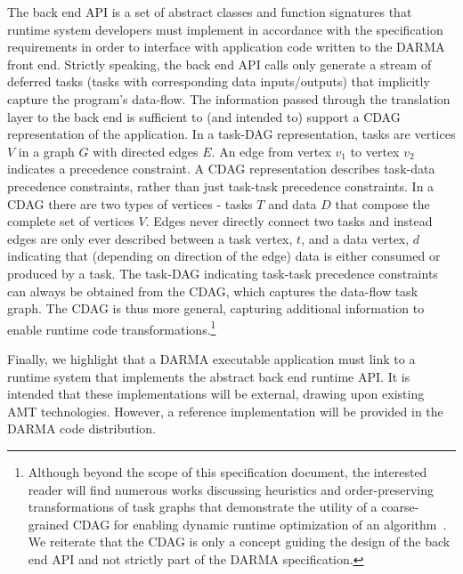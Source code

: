 The \gls{back end} \gls{API} is a set of abstract classes and function
signatures that \gls{runtime system} developers must implement in accordance with the
specification requirements in order to interface with application code written
to the \gls{DARMA} front end. 
Strictly speaking, the \gls{back end} \gls{API} calls only generate a stream of
\glspl{deferred task} (\glspl{task} with corresponding data inputs/outputs) that
implicitly capture the program's data-flow.
The information passed through the \gls{translation layer} to
the \gls{back end} is sufficient
to (and intended to) support a \gls{CDAG} representation of the application.
In a \gls{task-DAG} representation, \glspl{task} are vertices $V$ in a graph $G$ with directed edges $E$.
An edge from vertex $v_1$ to vertex $v_2$ indicates a precedence constraint.
A \gls{CDAG} representation describes task-data precedence constraints, rather
than just task-task precedence constraints.  In a \gls{CDAG} there are two
types of vertices - \glspl{task} $T$ and data $D$ that compose the complete set of vertices $V$.
Edges never directly connect two \glspl{task} and instead edges are only ever
described between a \gls{task} vertex, $t$, and a data vertex, $d$
indicating that (depending on direction of the edge) data is either consumed or
produced by a \gls{task}.
The \gls{task-DAG} indicating task-task precedence constraints can always be
obtained from the \gls{CDAG}, which captures the data-flow task graph.
The \gls{CDAG} is thus more general, capturing additional information to
enable runtime code transformations.\footnote{
Although beyond the scope of this specification document, the interested reader
will find numerous works discussing heuristics and order-preserving 
transformations of task graphs that demonstrate the utility of a coarse-grained
\gls{CDAG} for enabling dynamic runtime optimization of an
algorithm~\cite{KwokStaticScheduling,VydyanathanMixedParallel,FauziaReuseDistance2013}.
We reiterate that the \gls{CDAG} is only a concept guiding the design
of the \gls{back end} \gls{API} and not strictly part of the \gls{DARMA}
specification.}

Finally, we highlight that a \gls{DARMA} executable application must link to a \gls{runtime
  system} that implements the abstract \gls{back end} runtime \gls{API}.
It is intended that these implementations will be external, drawing upon
existing AMT technologies.  However,  a reference implementation will be provided
in the \gls{DARMA} code distribution.

